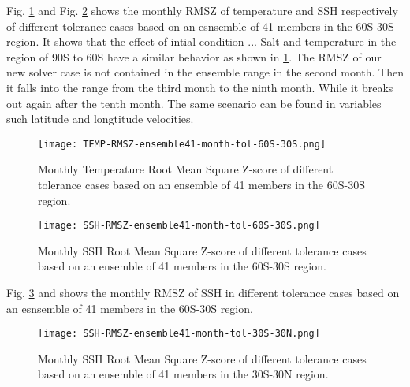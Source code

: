 \documentclass{sig-alternate}
\begin{document}
Fig. \ref{fig:temp_rmsz_60S} and Fig. \ref{fig:ssh_rmsz_60S} shows the monthly RMSZ of temperature and SSH respectively of different tolerance cases based on an esnsemble of 41 members in the 60S-30S region. 
It shows that the effect of intial condition ...
Salt and temperature in the region of 90S to 60S have a similar behavior as shown in \ref{fig:temp_rmsz_60S}. The RMSZ of our new solver case is not contained in the ensemble range in the second month. 
Then it falls into the range from the third month to the ninth month. While it breaks out again after the tenth month. The same scenario can be found in variables such latitude and longtitude velocities. 
\begin{figure}
\begin{center}
\texttt{[image: TEMP-RMSZ-ensemble41-month-tol-60S-30S.png]}
\end{center}
\caption[] {Monthly Temperature Root Mean Square Z-score of different tolerance cases based on an ensemble of 41 members in the 60S-30S region.}
\label{fig:temp_rmsz_60S}
\end{figure}

\begin{figure}
\begin{center}
\texttt{[image: SSH-RMSZ-ensemble41-month-tol-60S-30S.png]}
\end{center}
\caption[] {Monthly SSH Root Mean Square Z-score of different tolerance cases based on an ensemble of 41 members in the 60S-30S region.}
\label{fig:ssh_rmsz_60S}
\end{figure}

Fig. \ref{fig:ssh_rmsz_30S} and shows the monthly RMSZ of SSH in different tolerance cases based on an esnsemble of 41 members in the 60S-30S region. 
\begin{figure}
\begin{center}
\texttt{[image: SSH-RMSZ-ensemble41-month-tol-30S-30N.png]}
\end{center}
\caption[] {Monthly SSH Root Mean Square Z-score of different tolerance cases based on an ensemble of 41 members in the 30S-30N region.}
\label{fig:ssh_rmsz_30S}
\end{figure}
\end{document}
